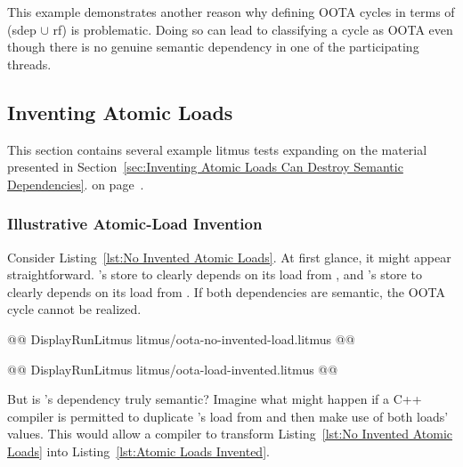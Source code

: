\documentclass[10]{article}
\begin{document}
This example demonstrates another reason why defining OOTA cycles
in terms of (sdep $\cup$ rf) is problematic.
Doing so can lead to classifying a cycle as OOTA even though there
is no genuine semantic dependency in one of the participating threads.

\subsection{Inventing Atomic Loads}
\label{app:Inventing Atomic Loads}

This section contains several example litmus tests
expanding on the material presented in
Section~\ref{sec:Inventing Atomic Loads Can Destroy Semantic Dependencies}.
on
page~\pageref{sec:Inventing Atomic Loads Can Destroy Semantic Dependencies}.

\subsubsection{Illustrative Atomic-Load Invention}
\label{app:Illustrative Atomic-Load Invention}

Consider Listing~\ref{lst:No Invented Atomic Loads}.
At first glance, it might appear straightforward.
's store to  clearly depends on its load from ,
and 's store to  clearly depends on its load from .
If both dependencies are semantic, the OOTA cycle cannot be realized.

\begin{listing}[tbp]
@@ DisplayRunLitmus litmus/oota-no-invented-load.litmus @@
\caption{No Invented Atomic Loads}
\label{lst:No Invented Atomic Loads}
\end{listing}

\begin{listing}[tbp]
@@ DisplayRunLitmus litmus/oota-load-invented.litmus @@
\caption{Atomic Loads Invented}
\label{lst:Atomic Loads Invented}
\end{listing}

But is 's dependency truly semantic?
Imagine what might happen if a C++ compiler is permitted to
duplicate 's load from  and then make use of both loads'
values.
This would allow a compiler to transform
Listing~\ref{lst:No Invented Atomic Loads}
into
Listing~\ref{lst:Atomic Loads Invented}.
\end{document}
